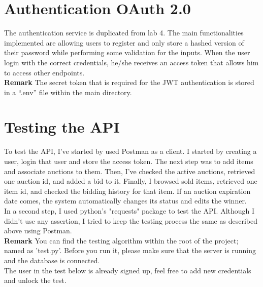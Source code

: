 \documentclass[12pt]{article}
\begin{document}
\section{Authentication OAuth 2.0}
The authentication service is duplicated from lab 4. The main functionalities implemented are allowing users to register and only store a hashed version of their password while performing some validation for the inputs. When the user login with the correct credentials, he/she receives an access token that allows him to access other endpoints.\\
\textbf{Remark}
The secret token that is required for the JWT authentication is stored in a “.env” file within the main directory.
\section{Testing the API}
To test the API, I’ve started by used Postman as a client. I started by creating a user, login that user and store the access token. The next step was to add items and associate auctions to them. Then, I’ve checked the active auctions, retrieved one auction id, and added a bid to it. Finally, I browsed sold items, retrieved one item id, and checked the bidding history for that item. If an auction expiration date comes, the system automatically changes its status and edits the winner.\\
In a second step, I used python's "requests" package to test the API. Although I didn't use any assertion, I tried to keep the testing process the same as described above using Postman.\\
\textbf{Remark}
You can find the testing algorithm within the root of the project; named as 'test.py'. Before you run it, please make sure that the server is running and the database is connected.\\
The user in the test below is already signed up, feel free to add new credentials and unlock the test.
\end{document}
